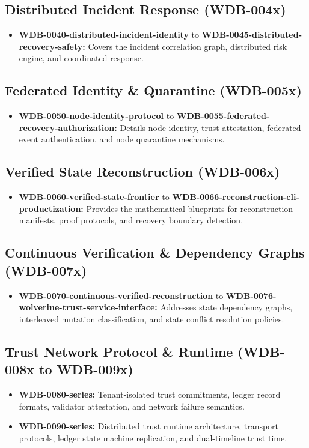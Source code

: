 \subsection{Distributed Incident Response (WDB-004x)}
\begin{itemize}
    \item \textbf{WDB-0040-distributed-incident-identity} to \textbf{WDB-0045-distributed-recovery-safety:} Covers the incident correlation graph, distributed risk engine, and coordinated response.
\end{itemize}

\subsection{Federated Identity \& Quarantine (WDB-005x)}
\begin{itemize}
    \item \textbf{WDB-0050-node-identity-protocol} to \textbf{WDB-0055-federated-recovery-authorization:} Details node identity, trust attestation, federated event authentication, and node quarantine mechanisms.
\end{itemize}

\subsection{Verified State Reconstruction (WDB-006x)}
\begin{itemize}
    \item \textbf{WDB-0060-verified-state-frontier} to \textbf{WDB-0066-reconstruction-cli-productization:} Provides the mathematical blueprints for reconstruction manifests, proof protocols, and recovery boundary detection.
\end{itemize}

\subsection{Continuous Verification \& Dependency Graphs (WDB-007x)}
\begin{itemize}
    \item \textbf{WDB-0070-continuous-verified-reconstruction} to \textbf{WDB-0076-wolverine-trust-service-interface:} Addresses state dependency graphs, interleaved mutation classification, and state conflict resolution policies.
\end{itemize}

\subsection{Trust Network Protocol \& Runtime (WDB-008x to WDB-009x)}
\begin{itemize}
    \item \textbf{WDB-0080-series:} Tenant-isolated trust commitments, ledger record formats, validator attestation, and network failure semantics.
    \item \textbf{WDB-0090-series:} Distributed trust runtime architecture, transport protocols, ledger state machine replication, and dual-timeline trust time.
\end{itemize}

